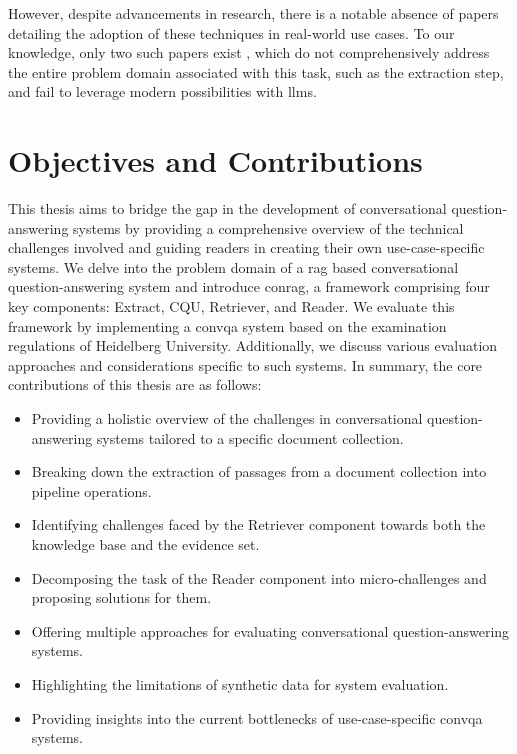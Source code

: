However, despite advancements in research, there is a notable absence of papers detailing the adoption of these techniques in real-world use cases. To our knowledge, only two such papers exist \cite{feng_dialdoc_2021,gholami_zero-shot_2021}, which do not comprehensively address the entire problem domain associated with this task, such as the extraction step, and fail to leverage modern possibilities with \gls{llm}s.

\section{Objectives and Contributions}

This thesis aims to bridge the gap in the development of conversational question-answering systems by providing a comprehensive overview of the technical challenges involved and guiding readers in creating their own use-case-specific systems. We delve into the problem domain of a \gls{rag} based conversational question-answering system and introduce \gls{conrag}, a framework comprising four key components: Extract, CQU, Retriever, and Reader. We evaluate this framework by implementing a \gls{convqa} system based on the examination regulations of Heidelberg University. Additionally, we discuss various evaluation approaches and considerations specific to such systems. In summary, the core contributions of this thesis are as follows:

\begin{itemize}
    \item Providing a holistic overview of the challenges in conversational question-answering systems tailored to a specific document collection.
    \item Breaking down the extraction of passages from a document collection into pipeline operations.
    \item Identifying challenges faced by the Retriever component towards both the knowledge base and the evidence set.
    \item Decomposing the task of the Reader component into micro-challenges and proposing solutions for them.
    \item Offering multiple approaches for evaluating conversational question-answering systems.
    \item Highlighting the limitations of synthetic data for system evaluation.
    \item Providing insights into the current bottlenecks of use-case-specific \gls{convqa} systems.
\end{itemize}


